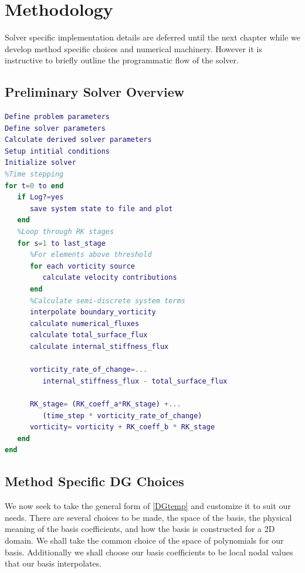 \documentclass[letterpaper,12pt]{report}
\begin{document}
\chapter{Methodology}
Solver specific implementation details are deferred until the next chapter while we develop method specific choices and numerical machinery. However it is instructive to briefly outline the programmatic flow of the solver.
\section{Preliminary Solver Overview}
\vspace{-1cm}
\singlespacing
\begin{lstlisting}[language=Matlab]
Define problem parameters
Define solver parameters
Calculate derived solver parameters
Setup intitial conditions
Initialize solver
%Time stepping
for t=0 to end
   if Log?=yes
      save system state to file and plot
   end
   %Loop through RK stages
   for s=1 to last_stage
      %For elements above threshold
      for each vorticity source
         calculate velocity contributions
      end
      %Calculate semi-discrete system terms
      interpolate boundary_vorticity
      calculate numerical_fluxes
      calculate total_surface_flux
      calculate internal_stiffness_flux
		
      vorticity_rate_of_change=...
         internal_stiffness_flux - total_surface_flux
		
      RK_stage= (RK_coeff_a*RK_stage) +...
         (time_step * vorticity_rate_of_change)
      vorticity= vorticity + RK_coeff_b * RK_stage
   end
end
\end{lstlisting}
\doublespacing

%
\section{Method Specific DG Choices} \label{DGchoice}
We now seek to take the general form of \eqref{DGtemp} and customize it to suit our needs. There are several choices to be made, the space of the basis, the physical meaning of the basis coefficients, and how the basis is constructed for a 2D domain. We shall take the common choice of the space of polynomials for our basis. Additionally we shall choose our basis coefficients to be local nodal values that our basis interpolates.
\end{document}
